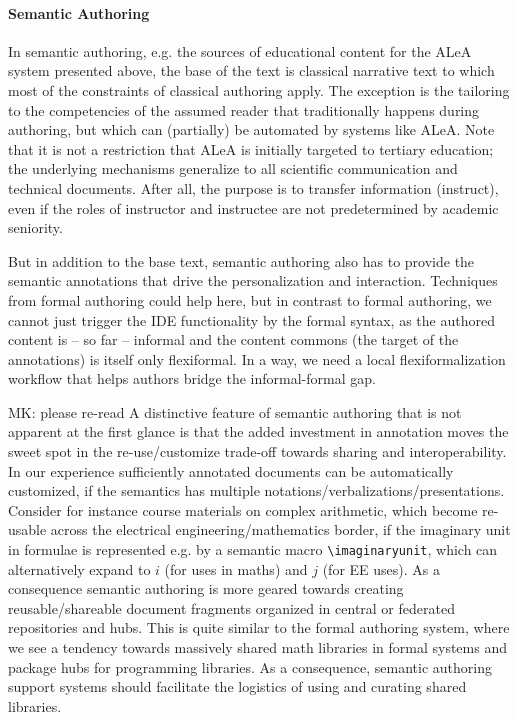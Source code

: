 \documentclass[runningheads]{llncs}
\newcommand\ALeA{\textsf{ALeA}\xspace}
\begin{document}
\paragraph{Semantic Authoring}
In semantic authoring, e.g. the \sTeX sources of educational content for the \ALeA system
presented above, the base of the text is classical narrative text to which most of the
constraints of classical authoring apply.
The exception is the tailoring to the competencies of the assumed reader
that traditionally happens during authoring, but which can (partially) be automated by systems like
\ALeA. Note that it is not a restriction that \ALeA is initially targeted to tertiary
education; the underlying mechanisms generalize to all scientific communication and
technical documents. After all, the purpose is to transfer information (instruct), even if
the roles of instructor and instructee are not predetermined by academic seniority.

But in addition to the base text, semantic authoring also has to provide the semantic
annotations that drive the personalization and interaction. Techniques from formal
authoring could help here, but in contrast to formal authoring, we cannot just trigger the
IDE functionality by the formal syntax, as the authored content is -- so far -- informal
and the content commons (the target of the annotations) is itself only flexiformal. In a
way, we need a local flexiformalization workflow that helps authors bridge the
informal-formal gap.

\begin{newpart}{MK: please re-read}
  A distinctive feature of semantic authoring that is not apparent at the first glance is
  that the added investment in annotation moves the sweet spot in the re-use/customize
  trade-off towards sharing and interoperability. In our experience sufficiently annotated
  documents can be automatically customized, if the semantics has multiple
  notations/verbalizations/presentations. Consider for instance course materials on
  complex arithmetic, which become re-usable across the electrical engineering/mathematics
  border, if the imaginary unit in formulae is represented e.g. by a semantic macro
  \lstinline|\imaginaryunit|, which can alternatively expand to $i$ (for uses in maths)
  and $j$ (for EE uses). As a consequence semantic authoring is more geared towards
  creating reusable/shareable document fragments organized in central or federated
  repositories and hubs. This is quite similar to the formal authoring system, where we
  see a tendency towards massively shared math libraries in formal systems and package
  hubs for programming libraries. As a consequence, semantic authoring support systems
  should facilitate the logistics of using and curating shared libraries.
\end{newpart}
\end{document}
